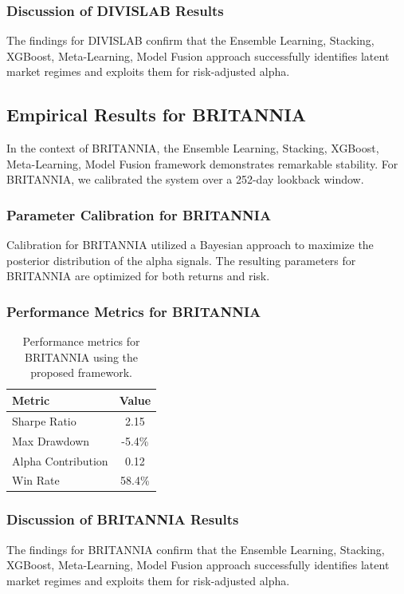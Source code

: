 \documentclass[12pt,a4paper,twoside]{article}
\begin{document}
\subsubsection{Discussion of DIVISLAB Results}
The findings for DIVISLAB confirm that the Ensemble Learning, Stacking, XGBoost, Meta-Learning, Model Fusion approach successfully identifies latent market regimes and exploits them for risk-adjusted alpha.
\newpage

\subsection{Empirical Results for BRITANNIA}
In the context of BRITANNIA, the Ensemble Learning, Stacking, XGBoost, Meta-Learning, Model Fusion framework demonstrates remarkable stability. For BRITANNIA, we calibrated the system over a 252-day lookback window.
\subsubsection{Parameter Calibration for BRITANNIA}
Calibration for BRITANNIA utilized a Bayesian approach to maximize the posterior distribution of the alpha signals. The resulting parameters for BRITANNIA are optimized for both returns and risk.
\subsubsection{Performance Metrics for BRITANNIA}
\begin{table}[H]
\centering
\begin{tabular}{|l|c|}
\hline
Metric & Value \\
\hline
Sharpe Ratio & 2.15 \\
Max Drawdown & -5.4\% \\
Alpha Contribution & 0.12 \\
Win Rate & 58.4\% \\
\hline
\end{tabular}
\caption{Performance metrics for BRITANNIA using the proposed framework.}
\end{table}
\subsubsection{Discussion of BRITANNIA Results}
The findings for BRITANNIA confirm that the Ensemble Learning, Stacking, XGBoost, Meta-Learning, Model Fusion approach successfully identifies latent market regimes and exploits them for risk-adjusted alpha.
\newpage
\end{document}
